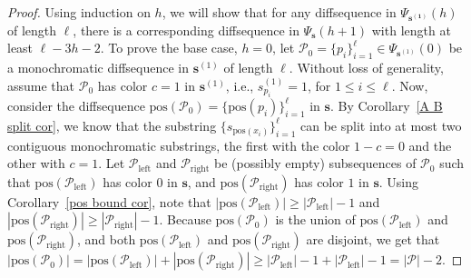 \documentclass[10pt,a4paper]{amsart}
\begin{document}
\begin{proof}
Using induction on $h$, we will show that for any diffsequence in $\Psi_{\mathbf{s^{(1)}}}(h)$ of length $\ell$, there is a corresponding diffsequence in $\Psi_{\mathbf{s}}(h+1)$ with length at least $\ell-3h-2$. To prove the base case, $h=0$, let $ \mathcal{P}_0 =\{ p_i\}_{i=1}^{\ell} \in \Psi_{\mathbf{s}^{(1)}}(0)$ be a monochromatic diffsequence in $\mathbf{s}^{(1)}$ of length $\ell$. Without loss of generality, assume that $ \mathcal{P}_0$ has color $c=1$ in $\mathbf{s}^{(1)}$, i.e., $s^{(1)}_{p_i} = 1$, for $1 \le i \le \ell$. Now, consider the diffsequence $\text{pos}(\mathcal{P}_0) = \{\text{pos}(p_i)\}_{i=1}^{\ell}$ in $\mathbf{s}$. By Corollary~\ref{A B split cor}, we know that the substring $\{s_{\text{pos}(x_i)}\}_{i=1}^{\ell}$ can be split into at most two contiguous monochromatic substrings, the first with the color $1-c=0$ and the other with $c=1$. Let $\mathcal{P}_{\text{left}}$ and $\mathcal{P}_{\text{right}}$ be (possibly empty) subsequences of $ \mathcal{P}_0$ such that $\text{pos}(\mathcal{P}_{\text{left}})$ has color $0$ in $\mathbf{s}$, and $\text{pos}(\mathcal{P}_{\text{right}})$ has color $1$ in $\mathbf{s}$. Using Corollary~\ref{pos bound cor}, note that $|\text{pos}(\mathcal{P}_{\text{left}})|\ge|\mathcal{P}_{\text{left}}|-1$ and $|\text{pos}(\mathcal{P}_{\text{right}})|\ge|\mathcal{P}_{\text{right}}|-1$. Because $\text{pos}(\mathcal{P}_0)$ is the union of $\text{pos}(\mathcal{P}_{\text{left}})$ and $\text{pos}(\mathcal{P}_{\text{right}})$, and both $\text{pos}(\mathcal{P}_{\text{left}})$ and $\text{pos}(\mathcal{P}_{\text{right}})$ are disjoint, we get that $|\text{pos}(\mathcal{P}_0)|=|\text{pos}(\mathcal{P}_{\text{left}})|+|\text{pos}(\mathcal{P}_{\text{right}})|\ge |\mathcal{P}_{\text{left}}|-1+|\mathcal{P}_{\text{left}}|-1=|\mathcal{P}|-2$.


\end{proof}
\end{document}
